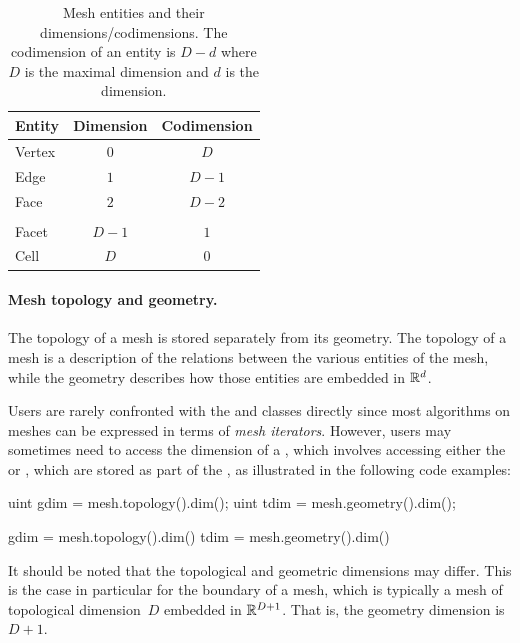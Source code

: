\begin{table}
  \centering
  \begin{tabular}{lcc}
    \toprule
    Entity & Dimension & Codimension \\
    \hline
    Vertex & $0$ & $D$ \\
    Edge & $1$ & $D-1$ \\
    Face & $2$ & $D-2$ \\
    & & \\
    Facet & $D-1$ & $1$ \\
    Cell & $D$ & $0$ \\
    \bottomrule
    \end{tabular}
  \caption{Mesh entities and their dimensions/codimensions. The
    codimension of an entity is $D - d$ where $D$ is the maximal
    dimension and $d$ is the dimension.}
  \label{tab:logg-2:entities}
\end{table}

\paragraph{Mesh topology and geometry.}

The topology of a mesh is stored separately from its geometry. The
topology of a mesh is a description of the relations between the
various entities of the mesh, while the geometry describes how those
entities are embedded in $\mathbb{R}^d$.

Users are rarely confronted with the  and
 classes directly since most algorithms on meshes can be
expressed in terms of \emph{mesh iterators}. However, users may sometimes
need to access the dimension of a , which involves accessing
either the  or , which are stored
as part of the , as illustrated in the following code examples:
\begin{c++}
uint gdim = mesh.topology().dim();
uint tdim = mesh.geometry().dim();
\end{c++}
\begin{python}
gdim = mesh.topology().dim()
tdim = mesh.geometry().dim()
\end{python}
It should be noted that the topological and geometric dimensions may
differ. This is the case in particular for the boundary of a mesh,
which is typically a mesh of topological dimension~$D$ embedded in
$\mathbb{R}^{D+1}$. That is, the geometry dimension is~$D + 1$.

